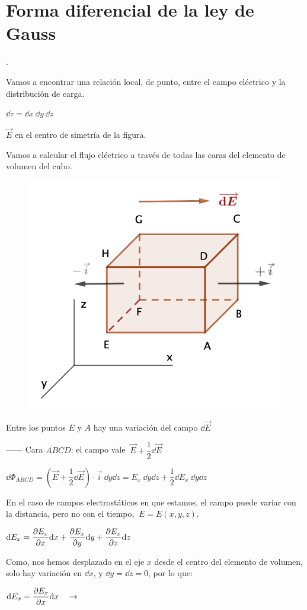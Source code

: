 \section{Forma diferencial de la ley de Gauss}

.


\begin{multicols}{2}
Vamos a encontrar una relación local, de punto, entre el campo eléctrico y la distribución de carga.

$\dd \tau=\dd x\ \dd y \ \dd z$

$\vec E$ en el centro de simetría de la figura.

Vamos a calcular el flujo eléctrico a través de todas las caras del elemento de volumen del cubo.
 
\begin{figure}[H]
	\centering
	\includegraphics[width=.5\textwidth]{imagenes/imagenes23/T23IM11.png}
\end{figure}	
\end{multicols}

Entre los puntos $E$ y $A$ hay una variación del campo $\dd \vec E$

------ Cara $ABCD$: el campo vale $\ \vec E + \dfrac 1 2 \dd \vec E$

$\dd \Phi_{ABCD}=\left( \vec E + \dfrac 1 2 \dd \vec E \right) \cdot \vec i \ \dd y \dd z=E_x \ \dd y \dd z + \dfrac 1 2 \dd E_x \ \dd y \dd z$ 

En el caso de campos electrostáticos en que estamos, el campo puede variar con la distancia, pero no con el tiempo, $\ E=E(x,y,z)$.

$\displaystyle \dd E_x=\pdv{E_x}{x} \dd x+\pdv{E_x}{y} \dd y+\pdv{E_x}{z} \dd z$

Como, nos hemos desplazado en el eje $x$ desde el centro del elemento de volumen, solo hay variación en $\dd x$, y $\dd y=\dd z=0$, por lo que: 

$\displaystyle \dd E_x=\pdv{E_x}{x} \dd x \quad \to \quad$

